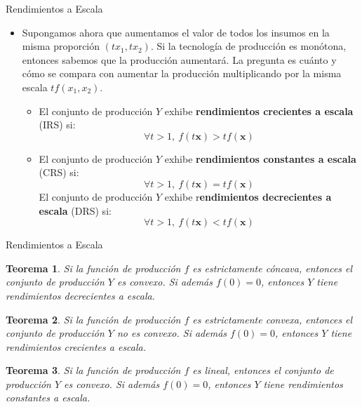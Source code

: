\documentclass{beamer}
\newtheorem{thm}{Teorema}
\theoremstyle{definition}
\begin{document}
\begin{frame}{Rendimientos a Escala}
	\begin{itemize}
		\item Supongamos ahora que aumentamos el valor de todos los insumos en la misma proporción $(tx_1,tx_2)$. Si la tecnología de producción es monótona, entonces sabemos que la producción aumentará. La pregunta es cuánto y cómo se compara con aumentar la producción multiplicando por la misma escala $tf(x_1,x_2)$.
  
  \begin{itemize}
      \item \small{El conjunto de producci\'on $Y$ exhibe \textbf{rendimientos crecientes a escala} (IRS) si: }
		\[\forall t > 1, \ f(t\textbf{x})>tf(\textbf{x})\]
  \item \small{El conjunto de producci\'on $Y$ exhibe \textbf{rendimientos constantes a escala} (CRS) si: }
		\[\forall t > 1, \ f(t\textbf{x})=tf(\textbf{x})\]
  \small{El conjunto de producci\'on $Y$ exhibe r\textbf{endimientos decrecientes a escala} (DRS) si: }
		\[\forall t > 1, \ f(t\textbf{x})<tf(\textbf{x})\]
  \end{itemize}
\end{itemize}	
\end{frame}

\begin{frame}{Rendimientos a Escala}
\begin{thm}
	Si la función de producci\'on $f$ es estrictamente c\'oncava, entonces el conjunto de producción $Y$ es convexo. Si además $f(0)=0$, entonces $Y$ tiene rendimientos decrecientes a escala.
\end{thm}
\begin{thm}
	Si la función de producci\'on $f$ es estrictamente convexa, entonces el conjunto de producción $Y$ no es convexo. Si además $f(0)=0$, entonces $Y$ tiene rendimientos crecientes a escala.
\end{thm}
\begin{thm}
	Si la función de producci\'on $f$ es lineal, entonces el conjunto de producción $Y$ es convexo. Si además $f(0)=0$, entonces $Y$ tiene rendimientos constantes a escala.
\end{thm}
\end{frame}
\end{document}
